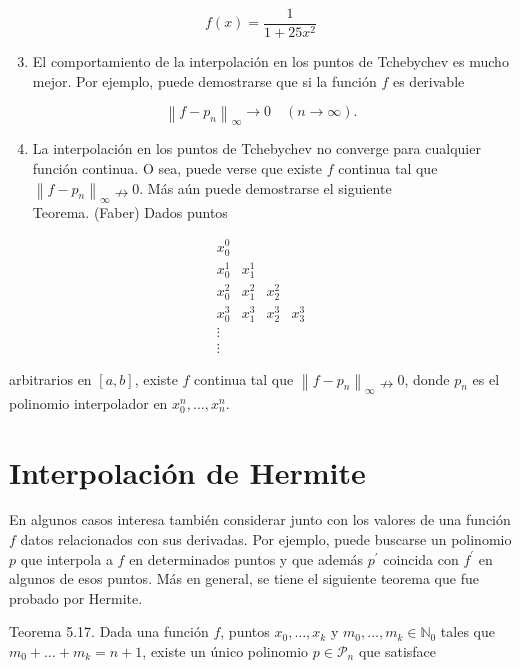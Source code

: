 \documentclass[10pt]{book}
\begin{document}
$$
f(x)=\frac{1}{1+25 x^{2}}
$$

\begin{enumerate}
  \setcounter{enumi}{2}
  \item El comportamiento de la interpolación en los puntos de Tchebychev es mucho mejor. Por ejemplo, puede demostrarse que si la función $f$ es derivable
\end{enumerate}

$$
\left\|f-p_{n}\right\|_{\infty} \rightarrow 0 \quad(n \rightarrow \infty) .
$$

\begin{enumerate}
  \setcounter{enumi}{3}
  \item La interpolación en los puntos de Tchebychev no converge para cualquier función continua. O sea, puede verse que existe $f$ continua tal que $\left\|f-p_{n}\right\|_{\infty} \nrightarrow 0$. Más aún puede demostrarse el siguiente\\
Teorema. (Faber) Dados puntos
\end{enumerate}

$$
\begin{array}{cccc}
x_{0}^{0} & & & \\
x_{0}^{1} & x_{1}^{1} & & \\
x_{0}^{2} & x_{1}^{2} & x_{2}^{2} & \\
x_{0}^{3} & x_{1}^{3} & x_{2}^{3} & x_{3}^{3} \\
\vdots & & & \\
\vdots & & &
\end{array}
$$

arbitrarios en $[a, b]$, existe $f$ continua tal que $\left\|f-p_{n}\right\|_{\infty} \nrightarrow 0$, donde $p_{n}$ es el polinomio interpolador en $x_{0}^{n}, \ldots, x_{n}^{n}$.

\section{Interpolación de Hermite}
En algunos casos interesa también considerar junto con los valores de una función $f$ datos relacionados con sus derivadas. Por ejemplo, puede buscarse un polinomio $p$ que interpola a $f$ en determinados puntos y que además $p^{\prime}$ coincida con $f^{\prime}$ en algunos de esos puntos. Más en general, se tiene el siguiente teorema que fue probado por Hermite.

Teorema 5.17. Dada una función $f$, puntos $x_{0}, \ldots, x_{k}$ y $m_{0}, \ldots, m_{k} \in \mathbb{N}_{0}$ tales que $m_{0}+\ldots+ m_{k}=n+1$, existe un único polinomio $p \in \mathcal{P}_{n}$ que satisface
\end{document}
